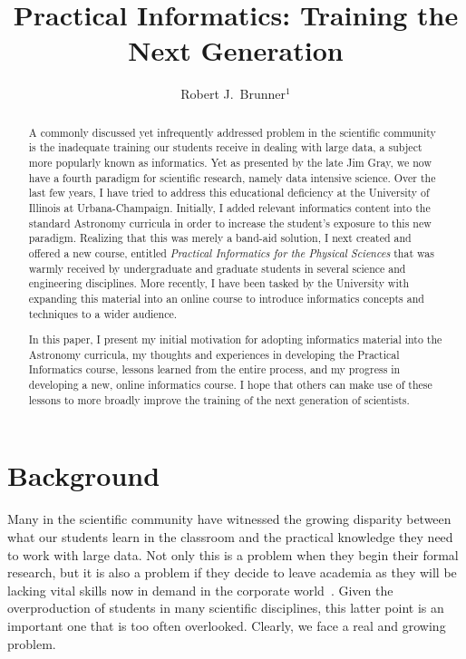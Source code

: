 \documentclass[11pt,twoside]{article}
\begin{document}
\title{Practical Informatics: Training the Next Generation}
\author{Robert J.~Brunner$^1$}

\begin{abstract}
A commonly discussed yet infrequently addressed problem in the scientific community is the inadequate training our students receive in dealing with large data, a subject more popularly known as informatics. Yet as presented by the late Jim Gray, we now have a fourth paradigm for scientific research, namely data intensive science. Over the last few years, I have tried to address this educational deficiency at the University of Illinois at Urbana-Champaign. Initially, I added relevant informatics content into the standard Astronomy curricula in order to increase the student's exposure to this new paradigm. Realizing that this was merely a band-aid solution, I next created and offered a new course, entitled \textit{Practical Informatics for the Physical Sciences} that was warmly received by undergraduate and graduate students in several science and engineering disciplines. More recently, I have been tasked by the University with expanding this material into an online course to introduce informatics concepts and techniques to a wider audience.

In this paper, I present my initial motivation for adopting informatics material into the Astronomy curricula, my thoughts and experiences in developing the Practical Informatics course, lessons learned from the entire process, and my progress in developing a new, online informatics course. I hope that others can make use of these lessons to more broadly improve the training of the next generation of scientists.
\end{abstract}

\section{Background}
Many in the scientific community have witnessed the growing disparity between what our students learn in the classroom and the practical knowledge they need to work with large data. Not only this is a problem when they begin their formal research, but it is also a problem if they decide to leave academia as they will be lacking vital skills now in demand in the corporate world~\citep[see, \textit{e.g.},][]{loukides}. Given the overproduction of students in many scientific disciplines, this latter point is an important one that is too often overlooked. Clearly, we face a real and growing problem.
\end{document}

